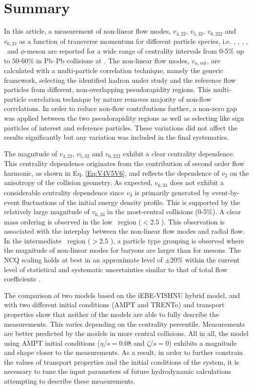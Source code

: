 \newpage

\section{Summary}
\label{Sec:conclusion}

In this article, a measurement of non-linear flow modes, $v_{4,22}$, $v_{5,32}$, $v_{6,222}$ and $v_{6,33}$ as a function of transverse momentum for different particle species, i.e. \pion, \kaon, \proton, \Ks, \lambdas~and $\phi$-meson are reported for a wide range of centrality intervals from 0-5\% up to 50-60\% in Pb--Pb collisions at \sNN. The non-linear flow modes, $v_{n,mk}$, are calculated with a multi-particle correlation technique, namely the generic framework, selecting the identified hadron under study and the reference flow particles from different, non-overlapping pseudorapidity regions. This multi-particle correlation technique by nature removes majority of non-flow correlations. In order to reduce non-flow contributions further, a non-zero gap was applied between the two pseudorapidity regions as well as selecting like sign particles of interest and reference particles. These variations did not affect the results significantly but any variation was included in the final systematics. 

The magnitude of $v_{4,22}$, $v_{5,32}$ and $v_{6,222}$ exhibit a clear centrality dependence. This centrality dependence originates from the contribution of second order flow harmonic, as shown in Eq. \ref{Eq:V4V5V6}, and reflects the dependence of $v_{2}$ on the anisotropy of the collision geometry. As expected, $v_{6,33}$ does not exhibit a considerable centrality dependence since $v_{3}$ is primarily generated by event-by-event fluctuations of the initial energy density profile. This is supported by the relatively large magnitude of $v_{6,33}$ in the most-central collisions (0-5\%). A clear mass ordering is observed in the low \pT~region (\pT$< 2.5$ \GeV). This observation is associated with the interplay between the non-linear flow modes and radial flow. In the intermediate \pT~region (\pT$> 2.5$ \GeV), a particle type grouping is observed where the magnitude of non-linear modes for baryons are larger than for mesons. The NCQ scaling holds at best in an approximate level of $\pm 20$\% within the current level of statistical and systematic uncertainties similar to that of total flow coefficients \cite{Acharya:2018zuq}.

The comparison of two models based on the iEBE-VISHNU hybrid model, and with two different initial conditions (AMPT and TRENTo) and transport properties show that neither of the models are able to fully describe the measurements. This varies depending on the centrality percentile. Measurements are better predicted by the models in more central collisions. All in all, the model using AMPT initial conditions ($\eta/s = 0.08$ and $\zeta/s =0$) exhibits a magnitude and shape closer to the measurements. As a result, in order to further constrain the values of transport properties and the initial conditions of the system, it is necessary to tune the input parameters of future hydrodynamic calculations attempting to describe these measurements.